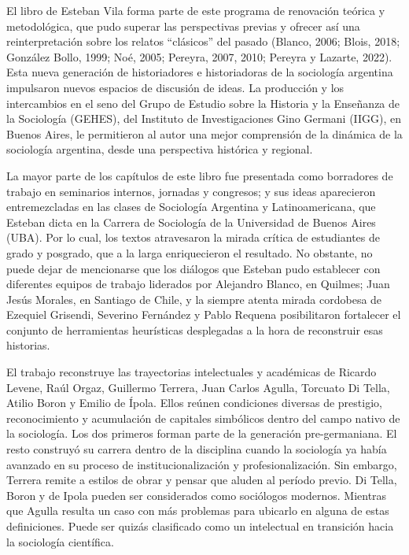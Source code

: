 El libro de Esteban Vila forma parte de este programa de renovación teórica y metodológica, que pudo superar las perspectivas previas y ofrecer así una reinterpretación sobre los relatos ``clásicos'' del pasado (Blanco, 2006; Blois, 2018; González Bollo, 1999; Noé, 2005; Pereyra, 2007, 2010; Pereyra y Lazarte, 2022). Esta nueva generación de historiadores e historiadoras de la sociología argentina impulsaron nuevos espacios de discusión de ideas. La producción y los intercambios en el seno del Grupo de Estudio sobre la Historia y la Enseñanza de la Sociología (GEHES), del Instituto de Investigaciones Gino Germani (IIGG), en Buenos Aires, le permitieron al autor una mejor comprensión de la dinámica de la sociología argentina, desde una perspectiva histórica y regional.

La mayor parte de los capítulos de este libro fue presentada como borradores de trabajo en seminarios internos, jornadas y congresos; y sus ideas aparecieron entremezcladas en las clases de Sociología Argentina y Latinoamericana, que Esteban dicta en la Carrera de Sociología de la Universidad de Buenos Aires (UBA). Por lo cual, los textos atravesaron la mirada crítica de estudiantes de grado y posgrado, que a la larga enriquecieron el resultado. No obstante, no puede dejar de mencionarse que los diálogos que Esteban pudo establecer con diferentes equipos de trabajo liderados por Alejandro Blanco, en Quilmes; Juan Jesús Morales, en Santiago de Chile, y la siempre atenta mirada cordobesa de Ezequiel Grisendi, Severino Fernández y Pablo Requena posibilitaron fortalecer el conjunto de herramientas heurísticas desplegadas a la hora de reconstruir esas historias.

El trabajo reconstruye las trayectorias intelectuales y académicas de Ricardo Levene, Raúl Orgaz, Guillermo Terrera, Juan Carlos Agulla, Torcuato Di Tella, Atilio Boron y Emilio de Ípola. Ellos reúnen condiciones diversas de prestigio, reconocimiento y acumulación de capitales simbólicos dentro del campo nativo de la sociología. Los dos primeros forman parte de la generación pre-germaniana. El resto construyó su carrera dentro de la disciplina cuando la sociología ya había avanzado en su proceso de institucionalización y profesionalización. Sin embargo, Terrera remite a estilos de obrar y pensar que aluden al período previo. Di Tella, Boron y de Ipola pueden ser considerados como sociólogos modernos. Mientras que Agulla resulta un caso con más problemas para ubicarlo en alguna de estas definiciones. Puede ser quizás clasificado como un intelectual en transición hacia la sociología científica.

